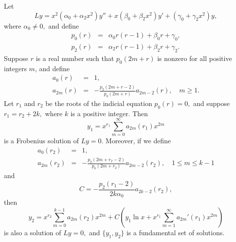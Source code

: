 \documentclass{ximera}
\begin{document}
\begin{theorem}\label{thmtype:7.7.2}
Let
$$
Ly=
x^2(\alpha_0+\alpha_2x^2)y''+x(\beta_0+\beta_2x^2)y'
+(\gamma_0+\gamma_2x^2)y,
$$
where $\alpha_0\neq0,$ and  define
\begin{eqnarray*}
p_0(r)&=&\alpha_0r(r-1)+\beta_0r+\gamma_0,\\
p_2(r)&=&\alpha_2r(r-1)+\beta_2r+\gamma_2.
\end{eqnarray*}
Suppose    $r$ is a real number such that $p_0(2m+r)$ is nonzero
for all positive integers $m$, and  define
\begin{equation} \label{eq:7.7.22}
\begin{array}{rcl}
a_0(r)&=&1,\\
a_{2m}(r)&=&-\frac{p_2(2m+r-2)}{p_0(2m+r)}a_{2m-2}(r),\quad m\geq 1.
\end{array}
\end{equation}
Let $r_1$ and $r_2$ be the roots of the indicial equation
$p_0(r)=0,$ and suppose   $r_1=r_2+2k,$ where $k$ is a positive
integer.  Then
$$
y_1=x^{r_1}\sum_{m=0}^\infty  a_{2m}(r_1)x^{2m}
$$
is a Frobenius solution of $Ly=0$.
Moreover, if we define
\begin{eqnarray*}
a_0(r_2)&=&1,\\
a_{2m}(r_2)&=&-\frac{p_2(2m+r_2-2)}{p_0(2m+r_2)}a_{2m-2}(r_2),\quad
1\leq m\leq k-1
\end{eqnarray*}
and
\begin{equation} \label{eq:7.7.23}
C=-\frac{p_2(r_1-2)}{2k\alpha_0}a_{2k-2}(r_2),
\end{equation}
then
\begin{equation} \label{eq:7.7.24}
y_2=x^{r_2}\sum_{m=0}^{k-1}a_{2m}(r_2)x^{2m}+C\left(y_1\ln
x+x^{r_1}\sum_{m=1}^\infty a_{2m}'(r_1)x^{2m}\right)
\end{equation}
is also a   solution of $Ly=0,$ and $\{y_1,y_2\}$
is a fundamental set of  solutions.
\end{theorem}
\end{document}
